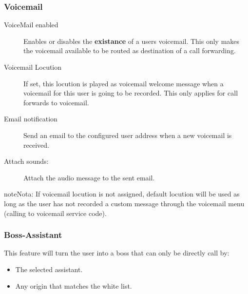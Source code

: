 \documentclass[letterpaper,10pt,spanish]{sphinxmanual}
\begin{document}
\subsubsection{Voicemail}
\label{administration_portal/client/vpbx/users:voicemail}\begin{description}
\item[{VoiceMail enabled}] \leavevmode{}\label{administration_portal/client/vpbx/users:term-voicemail-enabled}
Enables or disables the \textbf{existance} of a users voicemail.
This only makes the voicemail available to be routed as destination of a call forwarding.

\item[{Voicemail Locution}] \leavevmode{}\label{administration_portal/client/vpbx/users:term-voicemail-locution}
If set, this locution is played as voicemail welcome message when a voicemail
for this user is going to be recorded. This only applies for call forwards
to voicemail.

\item[{Email notification}] \leavevmode{}\label{administration_portal/client/vpbx/users:term-email-notification}
Send an email to the configured user address when a new voicemail is
received.

\item[{Attach sounds:}] \leavevmode{}\label{administration_portal/client/vpbx/users:term-attach-sounds}
Attach the audio message to the sent email.

\end{description}

\begin{notice}{note}{Nota:}
If voicemail locution is not assigned, default locution will be used as long as
the user has not recorded a custom message through the voicemail menu (calling to
voicemail service code).
\end{notice}


\subsubsection{Boss-Assistant}
\label{administration_portal/client/vpbx/users:boss-assistant}
This feature will turn the user into a boss that can only be directly call by:
\begin{itemize}
\item {} 
The selected assistant.

\item {} 
Any origin that matches the white list.

\end{itemize}
\end{document}
